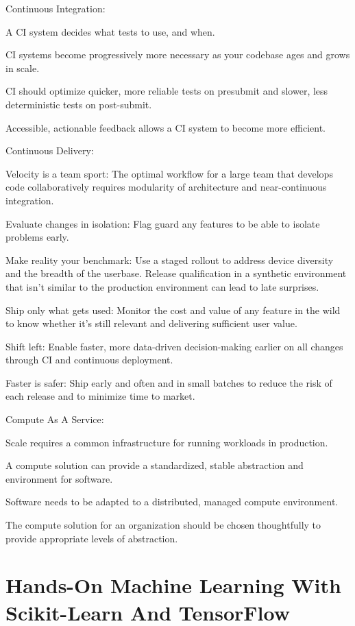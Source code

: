 Continuous Integration:
\bit
\item A CI system decides what tests to use, and when.
\item CI systems become progressively more necessary as your codebase ages and grows in scale.
\item CI should optimize quicker, more reliable tests on presubmit and slower, less deterministic tests on post-submit.
\item Accessible, actionable feedback allows a CI system to become more efficient.
\eit

Continuous Delivery:
\bit
\item Velocity is a team sport: The optimal workflow for a large team that develops code collaboratively requires
modularity of architecture and near-continuous integration.
\item Evaluate changes in isolation: Flag guard any features to be able to isolate problems early.
\item Make reality your benchmark: Use a staged rollout to address device diversity and the breadth of the userbase.
Release qualification in a synthetic environment that isn't similar to the production environment can lead to late
surprises.
\item Ship only what gets used: Monitor the cost and value of any feature in the wild to know whether it's still
relevant and delivering sufficient user value.
\item Shift left: Enable faster, more data-driven decision-making earlier on all changes through CI and continuous
deployment.
\item Faster is safer: Ship early and often and in small batches to reduce the risk of each release and to minimize
time to market.
\eit

Compute As A Service:
\bit
\item Scale requires a common infrastructure for running workloads in production.
\item A compute solution can provide a standardized, stable abstraction and environment for software.
\item Software needs to be adapted to a distributed, managed compute environment.
\item The compute solution for an organization should be chosen thoughtfully to provide appropriate levels of
abstraction.
\eit

\chapter{Hands-On Machine Learning With Scikit-Learn And TensorFlow}

